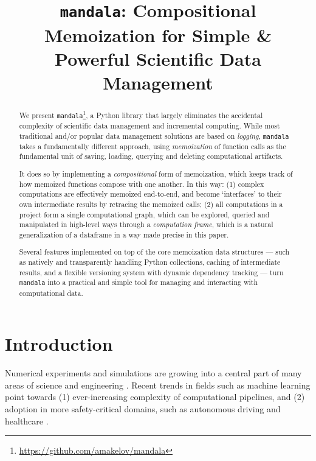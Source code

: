 \documentclass{article} %
\title{\texttt{mandala}: Compositional Memoization for Simple \&
Powerful Scientific Data Management}
\begin{document}
\maketitle


\begin{abstract}
  We present
  \texttt{mandala}\footnote{\url{https://github.com/amakelov/mandala}}, a Python
  library that largely eliminates the accidental complexity of scientific data
  management and incremental computing. While most traditional and/or
  popular data management solutions are based on \emph{logging},
  \texttt{mandala} takes a fundamentally different approach, using
  \emph{memoization} of function calls as the fundamental unit of saving,
  loading, querying and deleting computational artifacts. 
  
  It does so by implementing a \emph{compositional} form of memoization, which keeps
  track of how memoized functions compose with one another. In this way: (1)
  complex computations are effectively memoized end-to-end, and become
  `interfaces' to their own intermediate results by retracing the memoized
  calls; (2) all computations in a project form a single computational graph,
  which can be explored, queried and manipulated in high-level ways through a
  \emph{computation frame}, which is a natural generalization of a dataframe in
  a way made precise in this paper. 

  Several features implemented on top of the core memoization data structures ---
  such as natively and transparently handling Python collections, caching of
  intermediate results, and a flexible versioning system with dynamic dependency
  tracking --- turn \texttt{mandala} into a practical and simple tool for
  managing and interacting with computational data.
\end{abstract}

\section{Introduction}
\label{section:intro}

Numerical experiments and simulations are growing into a central part of many
areas of science and engineering \citep{hey2009fourth}. Recent trends in fields
such as machine learning point towards (1) ever-increasing complexity of
computational pipelines, and (2) adoption in more safety-critical domains, such
as autonomous driving \citep{bojarski2016end} and healthcare
\citep{ravi2016deep,abramson2024accurate}.
\end{document}
